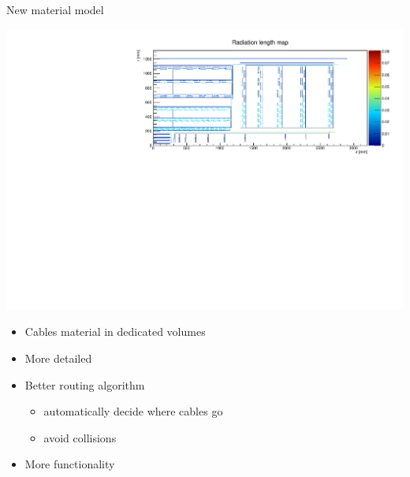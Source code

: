 \documentclass[pdftex, 11pt]{beamer}
\begin{document}
\begin{frame}{New material model}
  \begin{center}
    \includegraphics[width=\textwidth]{img/newModel.pdf}
  \end{center}
  \begin{itemize}
    \vspace*{-0.6cm}
  \item Cables material in \alert{dedicated} volumes
    \pause
  \item More \alert{detailed}
    \pause
  \item Better routing \alert{algorithm}
    \begin{itemize}
    \item \alert{automatically} decide where cables go
    \item avoid \alert{collisions}
    \end{itemize}
    \pause
  \item More \alert{functionality}
  \end{itemize}
\end{frame}
\end{document}
